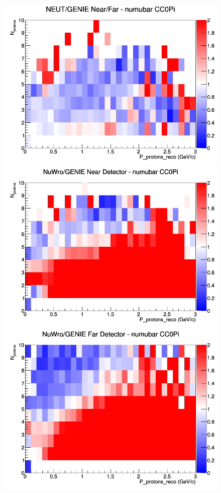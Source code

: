 \documentclass[12pt]{article}
\begin{document}
\begin{figure}[h]
\endminipage
{}
\includegraphics[width=\linewidth]{eff_N_P/FGT/protons/ratios/CC0Pi_NEUT_GENIE_numubar_NF_N_P.png}
\endminipage
\newline
{}
\includegraphics[width=\linewidth]{eff_N_P/FGT/protons/ratios/CC0Pi_NuWro_GENIE_numubar_near_N_P.png}
\endminipage
{}
\includegraphics[width=\linewidth]{eff_N_P/FGT/protons/ratios/CC0Pi_NuWro_GENIE_numubar_far_N_P.png}

\end{figure}
\end{document}

